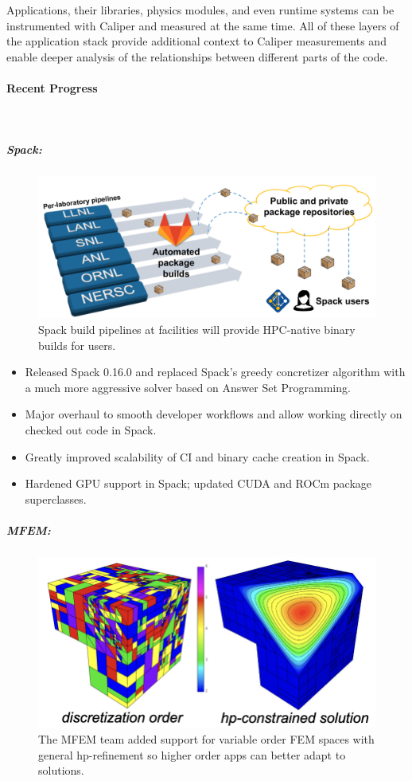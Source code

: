 Applications, their libraries, physics modules, and even runtime systems
can be instrumented with Caliper and measured at the same time.  All of
these layers of the application stack provide additional context to
Caliper measurements and enable deeper analysis of the relationships
between different parts of the code.



\paragraph{Recent Progress} \leavevmode \\


\subparagraph{Spack:}
\begin{figure}[tb]
\centering
\includegraphics[width=.75\textwidth]{projects/2.3.6-NNSA/2.3.6.02-LLNL-ATDM/spack-pipelines.pdf}
\caption{Spack build pipelines at facilities will provide HPC-native binary builds for users.}
\end{figure}


\begin{itemize}
\item Released Spack 0.16.0 and replaced Spack's greedy concretizer algorithm with a
      much more aggressive solver based on Answer Set Programming.
\item Major overhaul to smooth developer workflows and allow working directly on
      checked out code in Spack.
\item Greatly improved scalability of CI and binary cache creation in Spack.
\item Hardened GPU support in Spack; updated CUDA and ROCm package superclasses.
\end{itemize}

\subparagraph{MFEM:}

\begin{figure}[tb]
\centering
\includegraphics[width=.4\textwidth]{projects/2.3.6-NNSA/2.3.6.02-LLNL-ATDM/mfem-hp-refinement}
\caption{The MFEM team added support for variable order FEM spaces with general hp-refinement so higher order apps can better adapt to solutions.}
\end{figure}

